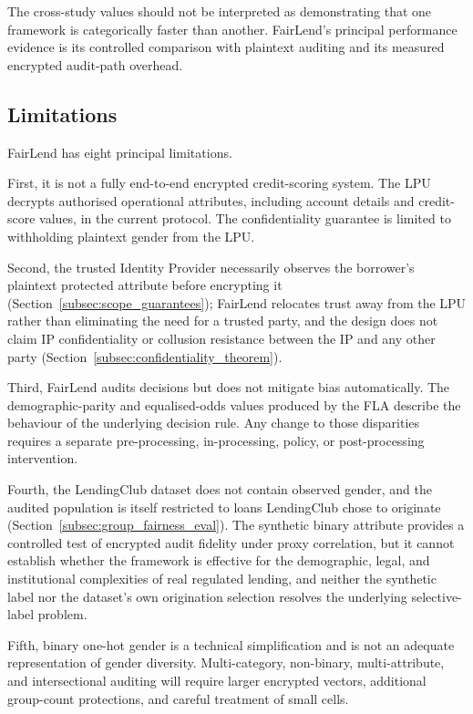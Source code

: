 \documentclass[a4paper,fleqn]{cas-dc}
\begin{document}
The cross-study values should not be interpreted as demonstrating that one framework is categorically faster than another. FairLend's principal performance evidence is its controlled comparison with plaintext auditing and its measured encrypted audit-path overhead.


\subsection{Limitations} 
\label{subsec:limitations} 
FairLend has eight principal limitations.

First, it is not a fully end-to-end encrypted credit-scoring system. The LPU decrypts authorised operational attributes, including account details and credit-score values, in the current protocol. The confidentiality guarantee is limited to withholding plaintext gender from the LPU.

Second, the trusted Identity Provider necessarily observes the borrower's plaintext protected attribute before encrypting it (Section~\ref{subsec:scope_guarantees}); FairLend relocates trust away from the LPU rather than eliminating the need for a trusted party, and the design does not claim IP confidentiality or collusion resistance between the IP and any other party (Section~\ref{subsec:confidentiality_theorem}).

Third, FairLend audits decisions but does not mitigate bias automatically. The demographic-parity and equalised-odds values produced by the FLA describe the behaviour of the underlying decision rule. Any change to those disparities requires a separate pre-processing, in-processing, policy, or post-processing intervention.

Fourth, the LendingClub dataset does not contain observed gender, and the audited population is itself restricted to loans LendingClub chose to originate (Section~\ref{subsec:group_fairness_eval}). The synthetic binary attribute provides a controlled test of encrypted audit fidelity under proxy correlation, but it cannot establish whether the framework is effective for the demographic, legal, and institutional complexities of real regulated lending, and neither the synthetic label nor the dataset's own origination selection resolves the underlying selective-label problem.

Fifth, binary one-hot gender is a technical simplification and is not an adequate representation of gender diversity. Multi-category, non-binary, multi-attribute, and intersectional auditing will require larger encrypted vectors, additional group-count protections, and careful treatment of small cells.
\end{document}

